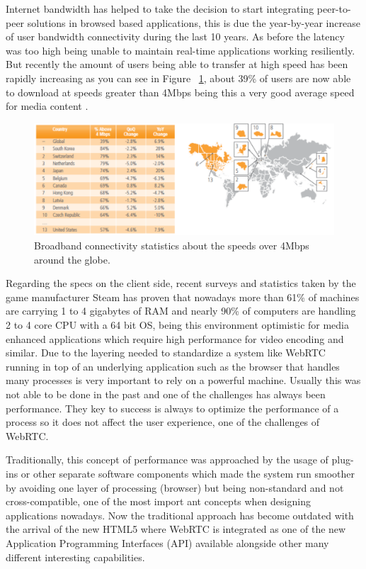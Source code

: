 Internet bandwidth has helped to take the decision to start integrating peer-to-peer solutions in browsed based applications, this is due the year-by-year increase of user bandwidth connectivity during the last 10 years. As before the latency was too high being unable to maintain real-time applications working resiliently. But recently the amount of users being able to transfer at high speed has been rapidly increasing as you can see in Figure ~\ref{fig:bwWorldAvg}, about 39\% of users are now able to download at speeds greater than 4Mbps being this a very good average speed for media content \cite{akamaiq2}.

\begin{figure}[h]
  \centering
    \includegraphics[width=1\textwidth]{./figures/internetstats.pdf}
      \caption[Broadband over 4Mbps connectivity statistics]{Broadband connectivity statistics about the speeds over 4Mbps around the globe.}
	\label{fig:bwWorldAvg}
\end{figure}

Regarding the specs on the client side, recent surveys and statistics taken by the game manufacturer Steam  \cite{steamStats} has proven that nowadays more than  61\% of machines are carrying 1 to 4 gigabytes of RAM and nearly 90\% of computers are handling 2 to 4 core CPU with a 64 bit OS, being this environment optimistic for media enhanced applications which require high performance for video encoding and similar. Due to the layering needed to standardize a system like WebRTC running in top of an underlying application such as the browser that handles many processes is very important to rely on a powerful machine. Usually this was not able to be done in the past and one of the challenges has always been performance. They key to success is always to optimize the performance of a process so it does not affect the user experience, one of the challenges of WebRTC.

Traditionally, this concept of performance was approached by the usage of plug-ins or other separate software components which made the system run smoother by avoiding one layer of processing (browser) but being non-standard and not cross-compatible, one of the most import ant concepts when designing applications nowadays. Now the traditional approach has become outdated with the arrival of the new HTML5 where WebRTC is integrated as one of the new Application Programming Interfaces (API) available alongside other many different interesting capabilities.

